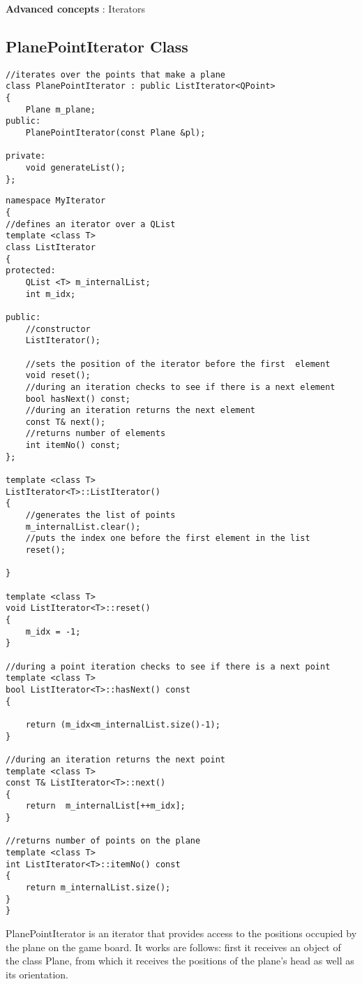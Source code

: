 \documentclass{article}
\begin{document}
\textbf {Advanced concepts} : Iterators
 
\subsection{PlanePointIterator Class}

\begin{lstlisting}
//iterates over the points that make a plane
class PlanePointIterator : public ListIterator<QPoint>
{
    Plane m_plane;
public:
    PlanePointIterator(const Plane &pl);

private:
    void generateList();
};
\end{lstlisting}

\begin{lstlisting}
namespace MyIterator
{
//defines an iterator over a QList
template <class T>
class ListIterator
{
protected:
    QList <T> m_internalList;
    int m_idx;

public:
    //constructor
    ListIterator();

    //sets the position of the iterator before the first  element
    void reset();
    //during an iteration checks to see if there is a next element
    bool hasNext() const;
    //during an iteration returns the next element
    const T& next();
    //returns number of elements
    int itemNo() const;
};

template <class T>
ListIterator<T>::ListIterator()
{
    //generates the list of points
    m_internalList.clear();
    //puts the index one before the first element in the list
    reset();

}

template <class T>
void ListIterator<T>::reset()
{
    m_idx = -1;
}

//during a point iteration checks to see if there is a next point
template <class T>
bool ListIterator<T>::hasNext() const
{

    return (m_idx<m_internalList.size()-1);
}

//during an iteration returns the next point
template <class T>
const T& ListIterator<T>::next()
{
    return  m_internalList[++m_idx];
}

//returns number of points on the plane
template <class T>
int ListIterator<T>::itemNo() const
{
    return m_internalList.size();
}
}
\end{lstlisting}

PlanePointIterator is an iterator that provides access to the positions occupied by the plane on the game board. It works are follows: first it receives an object of the class Plane, from which it receives the positions of the plane's head as well as its orientation.
\end{document}
